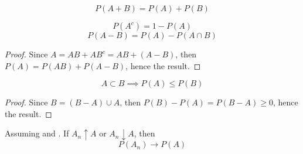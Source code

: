 \documentclass[11pt]{article}
\numberwithin{equation}{section}
\begin{document}
$$P(A + B) = P(A) + P(B)$$

\corollary[complementarity]
$$P(A^c) = 1 - P(A)$$
$$P(A - B) = P(A) - P(A\cap B)$$
\begin{proof}
	Since $A = AB + AB^c = AB + (A-B)$, then $P(A) = P(AB) + P(A-B)$, hence the result.
\end{proof}

\corollary[monotonicity]
$$A \subset B \implies P(A) \leq P(B)$$
\begin{proof}
	Since $B = (B - A) \cup A$, then $P(B) - P(A) = P(B - A) \geq 0$, hence the result.
\end{proof}

\proposition
Assuming  and . If $A_n \uparrow A$ or $A_n \downarrow A$, then
$$P(A_n) \rightarrow P(A)$$
\end{document}
